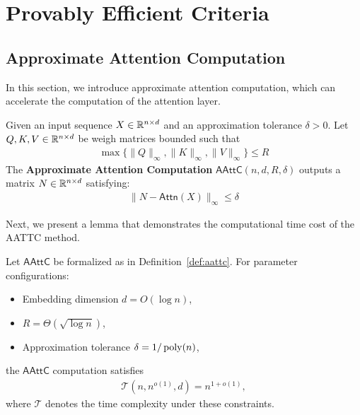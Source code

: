 \section{Provably Efficient Criteria}\label{sec:efficient_critieria}

\subsection{Approximate Attention Computation}\label{sec:fast_attn}
In this section, we introduce approximate attention computation, which can accelerate the computation of the attention layer.

\begin{definition}\label{def:aattc}
    Given an input sequence $X \in \mathbb{R}^{n \times d}$ and an approximation tolerance $\delta > 0$. Let $Q,K,V \in \mathbb{R}^{n \times d}$ be weigh matrices bounded such that
    \begin{align*}
        \max\{\|Q\|_\infty,\|K\|_\infty,\|V\|_\infty\} \leq R
    \end{align*}
    The {\bf Approximate Attention Computation} $\mathsf{AAttC}(n, d, R, \delta)$ outputs a matrix $N \in \mathbb{R}^{n \times d }$ satisfying:
    \begin{align*}
        \| N - \mathsf{Attn}(X)\|_\infty \leq \delta
    \end{align*}
\end{definition}

Next, we present a lemma that demonstrates the computational time cost of the AATTC method.
\begin{lemma}\label{lem:as23_attention}
Let $\mathsf{AAttC}$ be formalized as in Definition~\ref{def:aattc}. 
For parameter configurations:
\begin{itemize}
    \item Embedding dimension $d = O(\log n)$,
    \item $R = \Theta(\sqrt{\log n})$,
    \item Approximation tolerance $\delta = 1/\operatorname{poly}(n)$,
\end{itemize}
the $\mathsf{AAttC}$ computation satisfies
\begin{align*}
    \mathcal{T}(n, n^{o(1)}, d) = n^{1 + o(1)},
\end{align*}
where $\mathcal{T}$ denotes the time complexity under these constraints.

\end{lemma}


